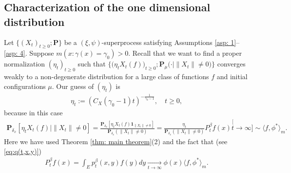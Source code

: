 \documentclass[12pt,a4paper]{amsart}
\theoremstyle{definition}
\numberwithin{equation}{section}
\begin{document}
\begin{comment}
\begin{proof}[Proof of Theorem \ref{thm: main theorem}(2)]
	According to \eqref{eq: equation for mu v-t} and \eqref{eq: uniform converges to 0},
\begin{align}
	- \log \mathbf P_\mu(\|X_t\| = 0)
	= \mu(v_t)
	\leq \mu(\phi) \| \phi^{-1} v_t\|_{\infty}
	\xrightarrow[t\to \infty]{} 0.
\end{align}
Therefore, $\mathbf P_\mu(\|X_t\| \neq 0) \xrightarrow[t\to \infty]{} 0$.

Noticing that $x \stackrel[x\to 0]{}{\sim} - \log(1-x)$, according to \eqref{eq: equation for mu v-t}, Lemma \ref{lem: asymptotic equivalent of integration} and Proposition \ref{prop: convergence in a same speed}, we have
\begin{align}
	\mathbf P_\mu(\|X_t\| \neq 0)
	\stackrel[t\to \infty]{}{\sim} - \log \mathbf P_\mu(\|X_t\| = 0)
	= \mu(\phi \phi^{-1}v_t)
	\stackrel[t\to\infty]{}{\sim} \mu(\phi) \langle v_t, \phi^*\rangle_m.
\end{align}
Therefore, according to Proposition \ref{prop: regularly varying of vt-phi-star}, we get the desired result.
\end{proof}
\end{comment}

\subsection{Characterization of the one dimensional distribution}
\label{sec: conditional distribution}
Let $\{(X_t)_{t\geq 0}; \mathbf P\}$ be a $(\xi, \psi)$-superprocess satisfying
Assumptions \ref{asp: 1}--\ref{asp: 4}.
Suppose  $m(x: \gamma(x) = \gamma_0)>0$.
Recall that we want to find a proper normalization $(\eta_t)_{t\geq 0}$ such that $\big\{\big(\eta_t X_t(f))_{t \geq 0}; \mathbf P_\mu(\cdot | \|X_t\| \neq 0\big)\big\}$ converges weakly to a non-degenerate distribution for a large class of functions $f$ and initial configurations $\mu$.
Our guess of $(\eta_t)$ is
\begin{align}\label{eq: definition of eta}
	\eta_t
	:= (C_X(\gamma_0 - 1) t)^{-\frac{1}{\gamma_0 - 1}},
	\quad t\geq 0,
\end{align}
because in this case
\begin{align}
 	\mathbf P_{\delta_x}[\eta_t X_t(f)|\|X_t\|\neq 0]
	= \frac{\mathbf P_{\delta_x}[\eta_t X_t(f) \mathbf 1_{\|X_t\|\neq 0}]} {\mathbf P_{\delta_x}(\|X_t\|\neq 0) }
	= \frac{\eta_t}{\mathbf P_{\delta_x}(\|X_t\|\neq 0)} P^\beta_t f(x)
	\stackrel[t\to \infty]{}{\sim}  \langle f,\phi^* \rangle_m.
\end{align}
Here we have used Theorem \ref{thm: main theorem}(2) and the fact that (see \eqref{eq:q(t,x,y)})
\begin{align}
 	P^\beta_t f(x)
 	= \int_E p_t^\beta(x,y)f(y)dy
 	\xrightarrow[t\to \infty]{}  \phi(x) \langle f,\phi^*\rangle_m.
\end{align}
 	
\end{document}
